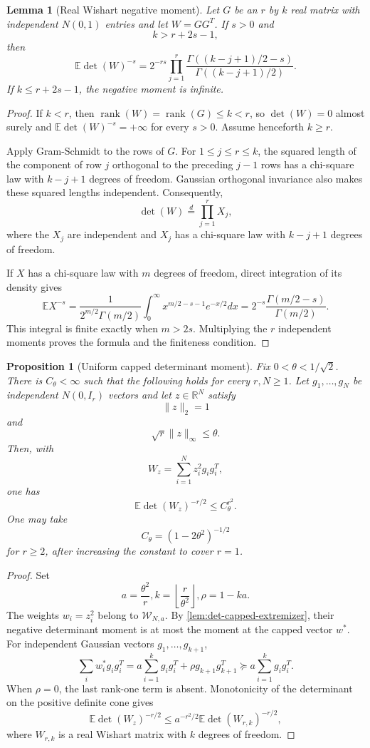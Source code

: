 \documentclass[11pt]{article}
\numberwithin{equation}{section}
\newtheorem{proposition}[theorem]{Proposition}
\newtheorem{lemma}[theorem]{Lemma}
\theoremstyle{definition}
\theoremstyle{remark}
\newcommand{\R}{\mathbb R}
\newcommand{\E}{\mathbb E}
\newcommand{\1}{\boldsymbol 1}
\newcommand{\rank}{\operatorname{rank}}
\begin{document}
\begin{aiblock}
\begin{lemma}[Real Wishart negative moment]
  \label{lem:det-wishart-moment}
  Let $G$ be an $r$ by $k$ real matrix with independent
  $N(0,1)$ entries and let $W=GG^T$. If $s>0$ and
  \[
    k>r+2s-1,
  \]
  then
  \[
    \E\det(W)^{-s} =2^{-rs}\prod_{j=1}^r
    \frac{\Gamma((k-j+1)/2-s)}{\Gamma((k-j+1)/2)}.
  \]
  If $k\le r+2s-1$, the negative moment is infinite.
\end{lemma}

\begin{proof}
  If $k<r$, then $\rank(W)=\rank(G)\leq k<r$, so
  $\det(W)=0$ almost surely and $\E\det(W)^{-s}=+\infty$
  for every $s>0$. Assume henceforth $k\geq r$.

  Apply Gram-Schmidt to the rows of $G$. For $1\leq
  j\leq r\leq k$, the squared length of the component of
  row $j$ orthogonal to the preceding $j-1$ rows has a
  chi-square law with $k-j+1$ degrees of freedom.
  Gaussian orthogonal invariance also makes these squared
  lengths independent. Consequently,
  \[
    \det(W)\stackrel{d}=\prod_{j=1}^rX_j,
  \]
  where the $X_j$ are independent and $X_j$ has a
  chi-square law with $k-j+1$ degrees of freedom.

  If $X$ has a chi-square law with $m$ degrees of
  freedom, direct integration of its density gives
  \[
    \E X^{-s} =\frac1{2^{m/2}\Gamma(m/2)}
    \int_0^\infty x^{m/2-s-1}e^{-x/2}dx
    =2^{-s}\frac{\Gamma(m/2-s)}{\Gamma(m/2)}.
  \]
  This integral is finite exactly when $m>2s$.
  Multiplying the $r$ independent moments proves the
  formula and the finiteness condition.
\end{proof}

\begin{proposition}[Uniform capped determinant moment]
  \label{prop:det-capped-moment}
  Fix $0<\theta<1/\sqrt2$. There is $C_\theta<\infty$
  such that the following holds for every $r,N\ge1$. Let
  $g_1,\ldots,g_N$ be independent $N(0,I_r)$ vectors and
  let $z\in\R^N$ satisfy
  \[
    \|z\|_2=1
  \]
  and
  \[
    \sqrt r\|z\|_\infty\le\theta.
  \]
  Then, with
  \[
    W_z=\sum_{i=1}^Nz_i^2g_ig_i^T,
  \]
  one has
  \[
    \E\det(W_z)^{-r/2}\le C_\theta^{r^2}.
  \]
  One may take
  \[
    C_\theta=(1-2\theta^2)^{-1/2}
  \]
  for $r\ge2$, after increasing the constant to cover
  $r=1$.
\end{proposition}

\begin{proof}
  Set
  \[
    a=\frac{\theta^2}{r},
    k=\left\lfloor\frac r{\theta^2}\right\rfloor,
    \rho=1-ka.
  \]
  The weights $w_i=z_i^2$ belong to $\mathcal W_{N,a}$.
  By \cref{lem:det-capped-extremizer}, their negative
  determinant moment is at most the moment at the capped
  vector $w^*$. For independent Gaussian vectors
  $g_1,\ldots,g_{k+1}$,
  \[
    \sum_iw_i^*g_ig_i^T =a\sum_{i=1}^kg_ig_i^T+\rho
    g_{k+1}g_{k+1}^T \succeq a\sum_{i=1}^kg_ig_i^T.
  \]
  When $\rho=0$, the last rank-one term is absent.
  Monotonicity of the determinant on the positive
  definite cone gives
  \[
    \E\det(W_z)^{-r/2} \le
    a^{-r^2/2}\E\det(W_{r,k})^{-r/2},
  \]
  where $W_{r,k}$ is a real Wishart matrix with $k$
  degrees of freedom.


\end{proof}
\end{aiblock}
\end{document}
